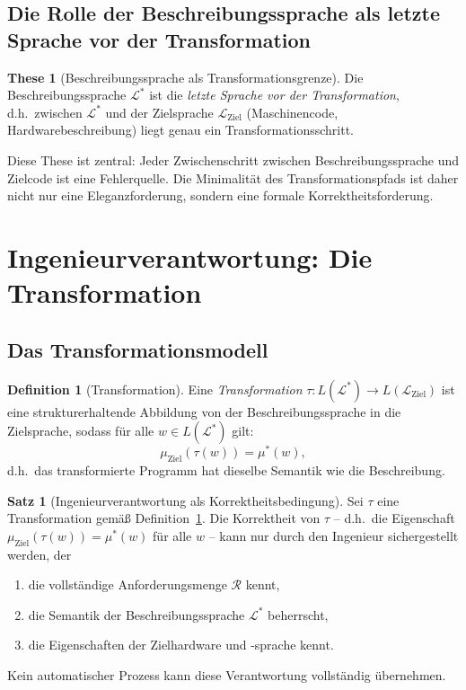 ﻿\documentclass[a4paper,12pt]{article}
\theoremstyle{definition}
\newtheorem{definition}{Definition}
\newtheorem{satz}{Satz}
\newtheorem{these}{These}
\begin{document}
\subsection{Die Rolle der Beschreibungssprache als letzte Sprache vor der Transformation}

\begin{these}[Beschreibungssprache als Transformationsgrenze]
Die Beschreibungssprache $\mathcal{L}^*$ ist die \emph{letzte Sprache vor der
Transformation}, d.h.\ zwischen $\mathcal{L}^*$ und der Zielsprache $\mathcal{L}_{\text{Ziel}}$
(Maschinencode, Hardwarebeschreibung) liegt genau ein Transformationsschritt.
\end{these}

Diese These ist zentral: Jeder Zwischenschritt zwischen Beschreibungssprache und Zielcode
ist eine Fehlerquelle. Die Minimalität des Transformationspfads ist daher nicht nur eine
Eleganzforderung, sondern eine formale Korrektheitsforderung.

\section{Ingenieurverantwortung: Die Transformation}
\label{sec:transformation}

\subsection{Das Transformationsmodell}

\begin{definition}[Transformation]
\label{def:transformation}
Eine \emph{Transformation} $\tau: L(\mathcal{L}^*) \to L(\mathcal{L}_{\text{Ziel}})$
ist eine strukturerhaltende Abbildung von der Beschreibungssprache in die Zielsprache,
sodass für alle $w \in L(\mathcal{L}^*)$ gilt:
\[
  \mu_{\text{Ziel}}(\tau(w)) = \mu^*(w),
\]
d.h.\ das transformierte Programm hat dieselbe Semantik wie die Beschreibung.
\end{definition}

\begin{satz}[Ingenieurverantwortung als Korrektheitsbedingung]
\label{satz:ingverantwortung}
Sei $\tau$ eine Transformation gemäß Definition~\ref{def:transformation}.
Die Korrektheit von $\tau$ -- d.h.\ die Eigenschaft $\mu_{\text{Ziel}}(\tau(w)) = \mu^*(w)$
für alle $w$ -- kann nur durch den Ingenieur sichergestellt werden, der
\begin{enumerate}
  \item die vollständige Anforderungsmenge $\mathcal{R}$ kennt,
  \item die Semantik der Beschreibungssprache $\mathcal{L}^*$ beherrscht,
  \item die Eigenschaften der Zielhardware und -sprache kennt.
\end{enumerate}
Kein automatischer Prozess kann diese Verantwortung vollständig übernehmen.
\end{satz}
\end{document}
